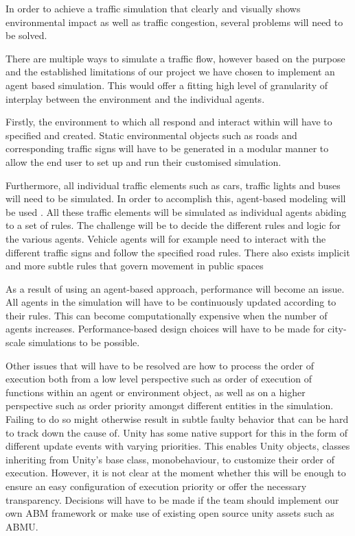 In order to achieve a traffic simulation that clearly and visually shows environmental impact as well as traffic congestion, several problems will need to be solved.

There are multiple ways to simulate a traffic flow, however based on the purpose and the established limitations of our project we have chosen to implement an agent based simulation. This would offer a fitting high level of granularity of interplay between the environment and the individual agents. 

Firstly, the environment to which all  respond and interact within will have to specified and created. Static environmental objects such as roads and corresponding traffic signs will have to be generated in a modular manner to allow the end user to set up and run their customised simulation.

Furthermore, all individual traffic elements such as cars, traffic lights and buses will need to be simulated. In order to accomplish this, agent-based modeling will be used \cite{agent-based-modeling}. All these traffic elements will be simulated as individual agents  abiding to a set of rules. The challenge will be to decide the different rules and logic for the various agents. Vehicle agents will for example need to interact with the different traffic signs and follow the specified road rules.
There also exists implicit and more subtle rules that govern movement in public spaces

As a result of using an agent-based approach, performance will become an issue. All agents in the simulation will have to be continuously updated according to their rules. This can become computationally expensive when the number of agents increases. Performance-based design choices will have to be made for city-scale simulations to be possible.

Other issues that will have to be resolved are how to process the order of execution both from a low level perspective such as order of execution of functions within an agent or environment object, as well as on a higher perspective such as order priority amongst different entities in the simulation. Failing to do so might otherwise result in subtle faulty behavior that can be hard to track down the cause of. Unity has some native support for this in the form of different update events with varying priorities. This enables Unity objects, classes inheriting from Unity's base class, monobehaviour, to customize their order of execution. However, it is not clear at the moment whether this will be enough to ensure an easy configuration of execution priority or offer the necessary transparency. Decisions will have to be made if the team should implement our own ABM framework or make use of existing open source unity assets such as ABMU.

